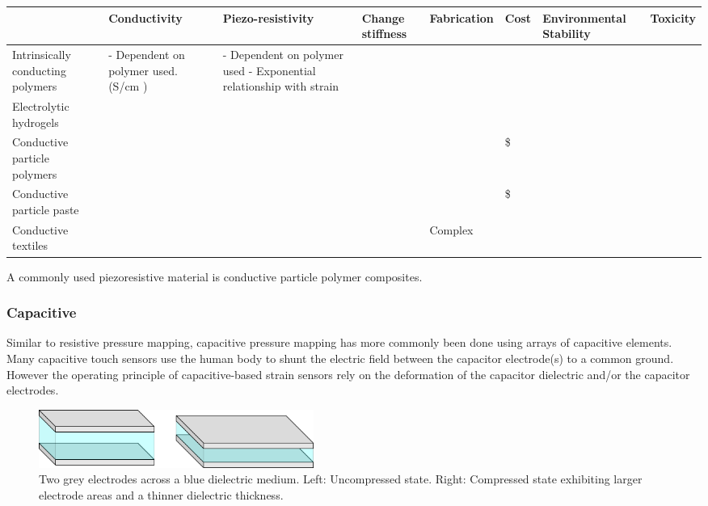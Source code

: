 \begin{table}[H]
	\begin{changemargin}{-2cm}{-2cm}
		\begin{tabular}{|p{2cm}|p{2cm}|p{2cm}|p{2cm}|p{2cm}|p{.8cm}|p{2cm}|p{2cm}|}
			\hline
			& Conductivity & Piezo-resistivity & Change stiffness & Fabrication & Cost & Environmental Stability & Toxicity \\ \hline
			Intrinsically conducting polymers & - Dependent on polymer used. (S/cm \cite{Hazelton2023}) & - Dependent on polymer used - Exponential relationship with strain\cite{Mukherjee2023} &  &  &  & & \\ \hline
			Electrolytic hydrogels &  &  &  &  &  &  &  \\ \hline
			Conductive particle polymers &  &  &  &  & \$ &  &  \\ \hline
			Conductive particle paste &  &  &  &  & \$ &  &  \\ \hline
			Conductive textiles &  &  &  & Complex &  &  & \\ \hline
		\end{tabular}
	\end{changemargin} 
\end{table}

A commonly used piezoresistive material is conductive particle polymer composites. 

\subsubsection{Capacitive}
Similar to resistive pressure mapping, capacitive pressure mapping has more commonly been done using arrays of capacitive elements. Many capacitive touch sensors use the human body to shunt the electric field between the capacitor electrode(s) to a common ground. However the operating principle of capacitive-based strain sensors rely on the deformation of the capacitor dielectric and/or the capacitor electrodes. 
\begin{figure}[H]
	\centering
	\includegraphics[width=9cm]{Figures/cap_deformed_states_x2_crop.png}
	\caption{Two grey electrodes across a blue dielectric medium. Left: Uncompressed state. Right: Compressed state exhibiting larger electrode areas and a thinner dielectric thickness.}
	\label{fig:cap_deformed_cube}
\end{figure}

